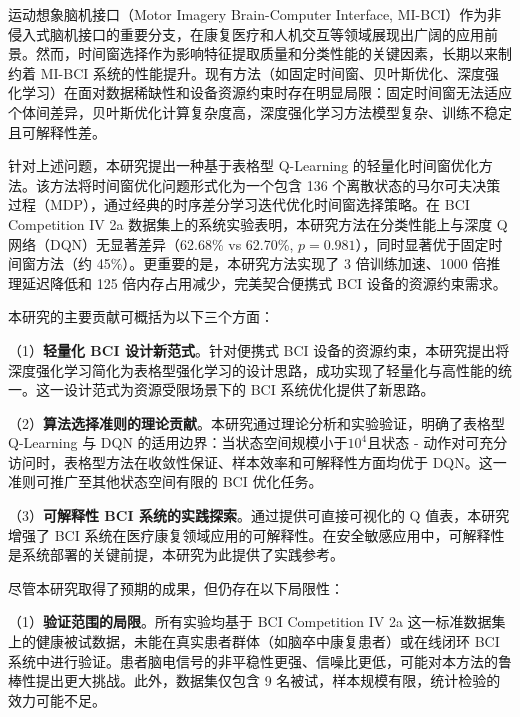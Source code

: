 
\label{chap:conclusion}

\label{sec:summary}

运动想象脑机接口（Motor Imagery Brain-Computer Interface, MI-BCI）作为非侵入式脑机接口的重要分支，在康复医疗和人机交互等领域展现出广阔的应用前景。然而，时间窗选择作为影响特征提取质量和分类性能的关键因素，长期以来制约着 MI-BCI 系统的性能提升。现有方法（如固定时间窗、贝叶斯优化、深度强化学习）在面对数据稀缺性和设备资源约束时存在明显局限：固定时间窗无法适应个体间差异，贝叶斯优化计算复杂度高，深度强化学习方法模型复杂、训练不稳定且可解释性差。

针对上述问题，本研究提出一种基于表格型 Q-Learning 的轻量化时间窗优化方法。该方法将时间窗优化问题形式化为一个包含 136 个离散状态的马尔可夫决策过程（MDP），通过经典的时序差分学习迭代优化时间窗选择策略。在 BCI Competition IV 2a 数据集上的系统实验表明，本研究方法在分类性能上与深度 Q 网络（DQN）无显著差异（62.68\% vs 62.70\%, $p = 0.981$），同时显著优于固定时间窗方法（约 45\%）。更重要的是，本研究方法实现了 3 倍训练加速、1000 倍推理延迟降低和 125 倍内存占用减少，完美契合便携式 BCI 设备的资源约束需求。

本研究的主要贡献可概括为以下三个方面：

（1）\textbf{轻量化 BCI 设计新范式}。针对便携式 BCI 设备的资源约束，本研究提出将深度强化学习简化为表格型强化学习的设计思路，成功实现了轻量化与高性能的统一。这一设计范式为资源受限场景下的 BCI 系统优化提供了新思路。

（2）\textbf{算法选择准则的理论贡献}。本研究通过理论分析和实验验证，明确了表格型 Q-Learning 与 DQN 的适用边界：当状态空间规模小于$10^4$且状态 - 动作对可充分访问时，表格型方法在收敛性保证、样本效率和可解释性方面均优于 DQN。这一准则可推广至其他状态空间有限的 BCI 优化任务。

（3）\textbf{可解释性 BCI 系统的实践探索}。通过提供可直接可视化的 Q 值表，本研究增强了 BCI 系统在医疗康复领域应用的可解释性。在安全敏感应用中，可解释性是系统部署的关键前提，本研究为此提供了实践参考。

\label{sec:limitations}

尽管本研究取得了预期的成果，但仍存在以下局限性：

（1）\textbf{验证范围的局限}。所有实验均基于 BCI Competition IV 2a 这一标准数据集上的健康被试数据，未能在真实患者群体（如脑卒中康复患者）或在线闭环 BCI 系统中进行验证。患者脑电信号的非平稳性更强、信噪比更低，可能对本方法的鲁棒性提出更大挑战。此外，数据集仅包含 9 名被试，样本规模有限，统计检验的效力可能不足。

